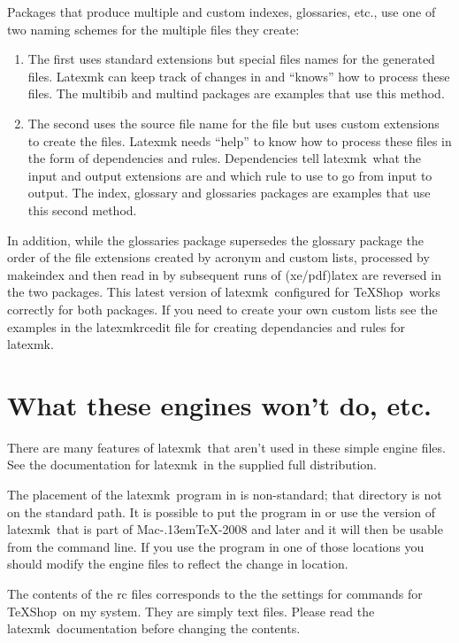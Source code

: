 \documentclass[11pt]{article}
\newcommand{\cmd}[1]{\textsf{#1}}
\newcommand{\MacTeX}{Mac\kern-.13em\TeX}
\newcommand{\TS}{\textsf{\TeX Shop}}
\newcommand{\latexmk}{\textsf{latexmk}}
\begin{document}
Packages that produce multiple and custom indexes, glossaries, etc., use one of two naming schemes for the multiple files they create:
\begin{enumerate}
\item
The first uses standard extensions but special files names for the generated files. \cmd{Latexmk} can keep track of changes in and ``knows'' how to process these files. The \cmd{multibib} and \cmd{multind} packages are examples that use this method.
\item
The second uses the source file name for the file but uses custom extensions to create the files. \cmd{Latexmk} needs ``help'' to know how to process these files in the form of dependencies and rules. Dependencies tell \latexmk\ what the input and output extensions are and which rule to use to go from input to output. The \cmd{index}, \cmd{glossary} and \cmd{glossaries} packages are examples that use this second method.
\end{enumerate}

In addition, while the \cmd{glossaries} package supersedes the \cmd{glossary} package the order of the file extensions created by acronym and custom lists, processed by \cmd{makeindex} and then read in by subsequent runs of \cmd{(xe/pdf)latex} are reversed in the two packages. This latest version of \latexmk\ configured for \TS\ works correctly for both packages. If you need to create your own custom lists see the examples in the \cmd{latexmkrcedit} file for creating dependancies and rules for \latexmk.

\section{What these engines won't do, etc.}

There are many features of \latexmk\ that aren't used in these simple \cmd{engine} files. See the documentation for \latexmk\ in the supplied full distribution.

The placement of the \latexmk\ program in  is non-standard; that directory is not on the standard path. It is possible to put the program in  or use the version of \latexmk\ that is part of \MacTeX-2008 and later and it will then be usable from the command line. If you use the program in one of those locations you should modify the \cmd{engine} files to reflect the change in location.

The contents of the \cmd{rc} files corresponds to the the settings for commands for \TS\ on my system. They are simply text files. Please read the \latexmk\ documentation before changing the contents.
\end{document}
